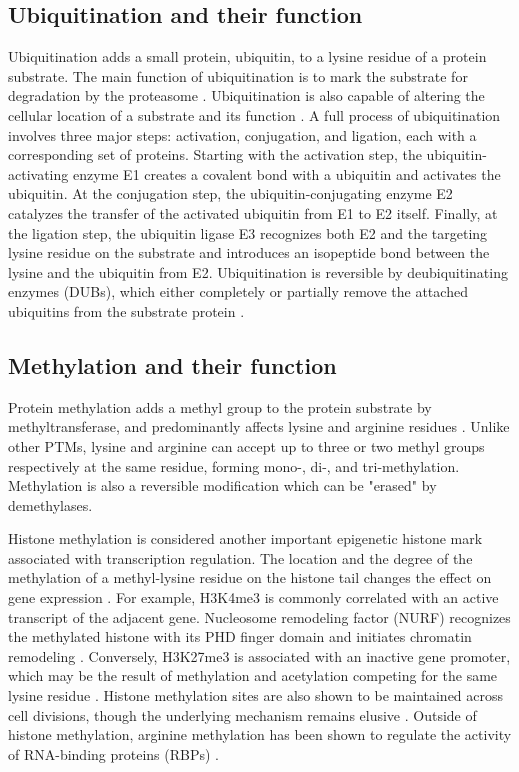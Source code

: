 \subsection{Ubiquitination and their function}
Ubiquitination adds a small protein, ubiquitin, to a lysine residue of a protein substrate. The main function of ubiquitination is to mark the substrate for degradation by the proteasome \cite{komanderd_rapem:UbiquitinCode2012}. Ubiquitination is also capable of altering the cellular location of a substrate \cite{mukhopadhyayd_riezmanh:ProteasomeIndependentFunctions2007} and its function \cite{schnelljd_hickel:NontraditionalFunctions2003}. A full process of ubiquitination involves three major steps: activation, conjugation, and ligation, each with a corresponding set of proteins. Starting with the activation step, the ubiquitin-activating enzyme E1 creates a covalent bond with a ubiquitin and activates the ubiquitin. At the conjugation step, the ubiquitin-conjugating enzyme E2 catalyzes the transfer of the activated ubiquitin from E1 to E2 itself. Finally, at the ligation step, the ubiquitin ligase E3 recognizes both E2 and the targeting lysine residue on the substrate and introduces an isopeptide bond between the lysine and the ubiquitin from E2. Ubiquitination is reversible by deubiquitinating enzymes (DUBs), which either completely or partially remove the attached ubiquitins from the substrate protein \cite{reyes-turcufe_wilkinsonkd:RegulationCellular2009}.


\subsection{Methylation and their function}
Protein methylation adds a methyl group to the protein substrate by methyltransferase, and predominantly affects lysine and arginine residues \cite{murnj_shiy:WindingPath2017}. Unlike other PTMs, lysine and arginine can accept up to three or two methyl groups respectively at the same residue, forming mono-, di-, and tri-methylation. Methylation is also a reversible modification which can be "erased" by demethylases.

Histone methylation is considered another important epigenetic histone mark associated with transcription regulation. The location and the degree of the methylation of a methyl-lysine residue on the histone tail changes the effect on gene expression \cite{greerel_shiy:HistoneMethylation2012}. For example, H3K4me3 is commonly correlated with an active transcript of the adjacent gene. Nucleosome remodeling factor (NURF) recognizes the methylated histone with its PHD finger domain and initiates chromatin remodeling \cite{wysockaj_alliscd:PHDFinger2006}. Conversely, H3K27me3 is associated with an inactive gene promoter, which may be the result of methylation and acetylation competing for the same lysine residue \cite{pasinid_helink:CharacterizationAntagonistic2010}. Histone methylation sites are also shown to be maintained across cell divisions, though the underlying mechanism remains elusive \cite{greerel_shiy:HistoneMethylation2012}. Outside of histone methylation, arginine methylation has been shown to regulate the activity of RNA-binding proteins (RBPs) \cite{murnj_shiy:WindingPath2017}.


